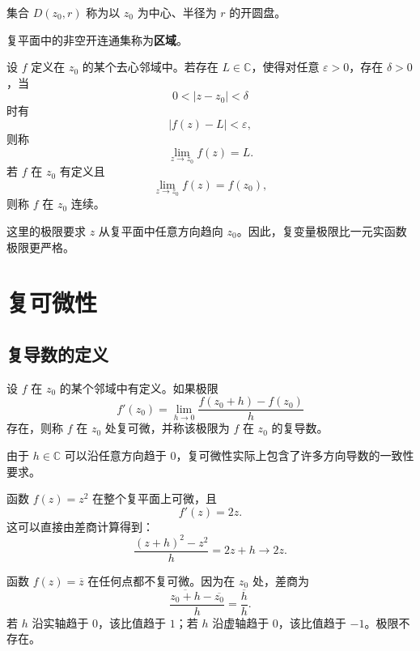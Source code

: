 \begin{definition}[开圆盘]
集合 $D(z_0,r)$ 称为以 $z_0$ 为中心、半径为 $r$ 的开圆盘。
\end{definition}

\begin{definition}[区域]
复平面中的非空开连通集称为\textbf{区域}。
\end{definition}

\begin{definition}[极限与连续性]
设 $f$ 定义在 $z_0$ 的某个去心邻域中。若存在 $L\in\mathbb{C}$，使得对任意 $\varepsilon>0$，存在 $\delta>0$，当
\[
    0<|z-z_0|<\delta
\]
时有
\[
    |f(z)-L|<\varepsilon,
\]
则称
\[
    \lim_{z\to z_0}f(z)=L.
\]
若 $f$ 在 $z_0$ 有定义且
\[
    \lim_{z\to z_0}f(z)=f(z_0),
\]
则称 $f$ 在 $z_0$ 连续。
\end{definition}

这里的极限要求 $z$ 从复平面中任意方向趋向 $z_0$。因此，复变量极限比一元实函数极限更严格。

\section{复可微性}

\subsection{复导数的定义}

\begin{definition}[复导数]
设 $f$ 在 $z_0$ 的某个邻域中有定义。如果极限
\[
    f'(z_0)=\lim_{h\to0}\frac{f(z_0+h)-f(z_0)}{h}
\]
存在，则称 $f$ 在 $z_0$ 处复可微，并称该极限为 $f$ 在 $z_0$ 的复导数。
\end{definition}

由于 $h\in\mathbb{C}$ 可以沿任意方向趋于 $0$，复可微性实际上包含了许多方向导数的一致性要求。

\begin{example}
函数 $f(z)=z^2$ 在整个复平面上可微，且
\[
    f'(z)=2z.
\]
这可以直接由差商计算得到：
\[
    \frac{(z+h)^2-z^2}{h}=2z+h\to2z.
\]
\end{example}

\begin{example}[复共轭函数]
函数 $f(z)=\overline z$ 在任何点都不复可微。因为在 $z_0$ 处，差商为
\[
    \frac{\overline{z_0+h}-\overline{z_0}}{h}=\frac{\overline h}{h}.
\]
若 $h$ 沿实轴趋于 $0$，该比值趋于 $1$；若 $h$ 沿虚轴趋于 $0$，该比值趋于 $-1$。极限不存在。
\end{example}

